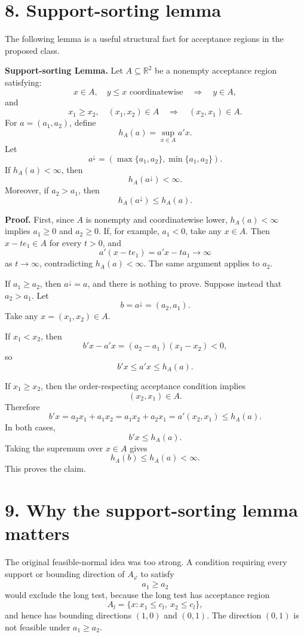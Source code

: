 \documentclass[11pt]{article}
\begin{document}
\section*{8. Support-sorting lemma}

The following lemma is a useful structural fact for acceptance regions in the proposed class.

\medskip
\noindent
\textbf{Support-sorting Lemma.}
Let \(A\subseteq\mathbb R^2\) be a nonempty acceptance region satisfying:
\[
x\in A,
\quad
y\le x\text{ coordinatewise}
\quad\Longrightarrow\quad
y\in A,
\]
and
\[
x_1\ge x_2,
\quad
(x_1,x_2)\in A
\quad\Longrightarrow\quad
(x_2,x_1)\in A.
\]
For \(a=(a_1,a_2)\), define
\[
h_A(a)=\sup_{x\in A}a'x.
\]
Let
\[
a^\downarrow=(\max\{a_1,a_2\},\min\{a_1,a_2\}).
\]
If \(h_A(a)<\infty\), then
\[
h_A(a^\downarrow)<\infty.
\]
Moreover, if \(a_2>a_1\), then
\[
h_A(a^\downarrow)\le h_A(a).
\]

\medskip
\noindent
\textbf{Proof.}
First, since \(A\) is nonempty and coordinatewise lower, \(h_A(a)<\infty\) implies \(a_1\ge0\) and \(a_2\ge0\). If, for example, \(a_1<0\), take any \(x\in A\). Then \(x-te_1\in A\) for every \(t>0\), and
\[
a'(x-te_1)=a'x-ta_1\to\infty
\]
as \(t\to\infty\), contradicting \(h_A(a)<\infty\). The same argument applies to \(a_2\).

If \(a_1\ge a_2\), then \(a^\downarrow=a\), and there is nothing to prove. Suppose instead that \(a_2>a_1\). Let
\[
b=a^\downarrow=(a_2,a_1).
\]
Take any \(x=(x_1,x_2)\in A\).

If \(x_1<x_2\), then
\[
b'x-a'x
=
(a_2-a_1)(x_1-x_2)<0,
\]
so
\[
b'x\le a'x\le h_A(a).
\]

If \(x_1\ge x_2\), then the order-respecting acceptance condition implies
\[
(x_2,x_1)\in A.
\]
Therefore
\[
b'x=a_2x_1+a_1x_2=a_1x_2+a_2x_1=a'(x_2,x_1)\le h_A(a).
\]
In both cases,
\[
b'x\le h_A(a).
\]
Taking the supremum over \(x\in A\) gives
\[
h_A(b)\le h_A(a)<\infty.
\]
This proves the claim.

\section*{9. Why the support-sorting lemma matters}

The original feasible-normal idea was too strong. A condition requiring every support or bounding direction of \(A_\varphi\) to satisfy
\[
a_1\ge a_2
\]
would exclude the long test, because the long test has acceptance region
\[
A_l=\{x:x_1\le c_l,
\ x_2\le c_l\},
\]
and hence has bounding directions \((1,0)\) and \((0,1)\). The direction \((0,1)\) is not feasible under \(a_1\ge a_2\).
\end{document}
